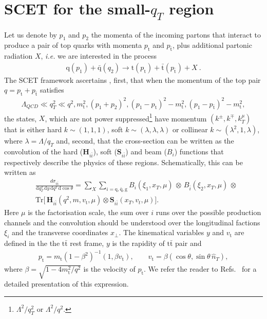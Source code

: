 \documentclass{appolb}
\newcommand{\dd}{\text{d}}
\newcommand{\ttb}{\text{t} \bar{\text{t}} }
\newcommand{\txt}{\text{t} }
\newcommand{\txtb}{\bar{\text{t}} }
\begin{document}
\section{SCET for the small-$q_T$ region}
Let us denote by $p_1$ and $p_2$ the momenta of the incoming partons that interact to produce a pair of top quarks with momenta $p_\txt$ and $p_{\txtb}$, plus additional partonic radiation $X$, \emph{i.e.} we are interested in the process
\begin{align}
\text{q}(p_1)+\bar{\text{q}}(q_2)\to \txt(p_{\txt})+ \bar{\txt} (p_{\txtb})+X~.
\end{align}
The SCET framework  ascertains \cite{Li:2013mia}, first, that when the  momentum of the top pair $q= p_\txt+p_{\txtb}$ satisfies
\begin{align}
\Lambda_{QCD}\ll q_T^2\ll q^2, m_\txt^2 ,(p_1+p_2)^2, (p_1-p_{\txt})^2-m_\txt^2, (p_1-p_{\txtb})^2-m_\txt^2, 
\end{align}
the states, $X$, which are not power suppressed\footnote{$\Lambda^2/q_T^2$ or $\Lambda^2/q^2$.} have momentum $(k^{\pm},k^{\mp},k_T^\mu)$ that is either hard $k\sim(1,1,1)$, soft $k\sim(\lambda,\lambda,\lambda)$ or collinear $k\sim(\lambda^2,1,\lambda)$, where $\lambda=\Lambda/q_T$ and,  second, that the cross-section can be written as the convolution of the hard ($\mathbf {H}_{i\bar{i}}$),  soft ($\mathbf {S}_{i\bar{i}}$) and beam ($B_i$)  functions  that respectively describe the physics of these regions. Schematically, this can be written as
\begin{align}
  &\frac{d\sigma_{\ttb}}{\dd q_T^2 \, \dd y \, \dd q^2 \, \dd \! \cos\theta} = 
 \sum_X 
  \sum_{i = \text{q},\bar{\text{q}},\text{g} }   
B_{i} (\xi_1, x_T,\mu) \,  \otimes\, 
B_{\bar{i}}(\xi_2, x_T,\mu)\, \otimes\nonumber  \\
&   \text{Tr} 
  \big[\,  \mathbf {H}_{i\bar{i}}(q^2,m, v_\txt ,\mu)  
  \otimes  \mathbf {S}_{i\bar{i}}(x_T, v_t ,\mu)  \big]. \label{eq:Factorisation}
\end{align}
Here  $\mu$ is the factorisation scale, the sum over $i$ runs over the possible production channels and the convolution should be understood over the longitudinal factions $\xi_i$ and the transverse coordinates $x_\perp$. The kinematical variables $y$ and $v_{\txt}$ are defined in the the $\ttb$ rest frame, $y$ is the rapidity of $\ttb$ pair and 
\begin{align}
p_\txt=m_{\txt}(1-\beta^2)^{-1} (1,\beta v_\txt),\qquad  v_\txt= \beta(\cos\theta  ,\sin\theta\, \hat{n}_T), 
\end{align}
where $\beta= \sqrt{1-4 m^2_\txt/q^2}$ is the velocity of $p_\txt$. We refer the reader to Refs.~\cite{Li:2013mia,Gehrmann:2014yya} for a detailed presentation of this expression. 
\end{document}
